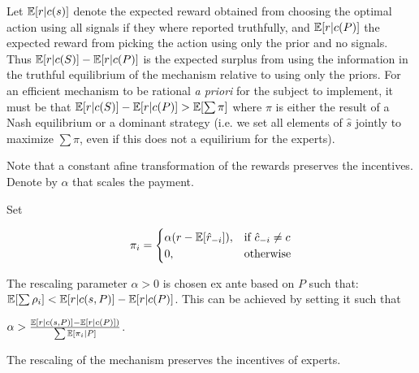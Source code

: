 Let $\operatorname*{\mathbb E}[r|c(s)]$ denote the expected reward obtained from choosing the optimal action using all signals if they where reported truthfully, and $\operatorname*{\mathbb E}[r|c(P)] $ the expected reward from picking the action using only the prior and no signals. Thus $\operatorname*{\mathbb E}[r|c(S)] - \operatorname*{\mathbb E}[r|c(P)] $ is the expected surplus from using the information in the truthful equilibrium of the mechanism relative to using only the priors. For an efficient mechanism to be rational \emph{a priori} for the subject to implement, it must be that $\operatorname*{\mathbb E}[r|c(S)] - \operatorname*{\mathbb E}[r|c(P)] > \operatorname*{\mathbb E}[\sum \pi]$ where $\pi$ is either the result of a Nash equilibrium or a dominant strategy (i.e. we set all elements of $\hat{s}$ jointly to maximize $\sum \pi$, even if this does not a equilirium for the experts).

Note that a constant afine transformation of the rewards preserves the incentives. Denote by $\alpha$ that scales the payment.

\begin{mech}
Set

\[
    \pi_i = 
\begin{cases}
    \alpha (r - \expec[\hat{r}_{-i}] ),& \text{if } \hat{c}_{-i} \neq c\\
    0,              & \text{otherwise}
\end{cases}
\]

The rescaling parameter $\alpha>0$ is chosen ex ante based on $P$ such that: $ \operatorname*{\mathbb E}[\sum \rho_i] < \operatorname*{\mathbb E}[r|c(s,P)] - \operatorname*{\mathbb E}[r|c(P)] $. This can be achieved by setting it such that

 $\alpha >   \frac{\operatorname*{\mathbb E}[r|c(s,P)] - \operatorname*{\mathbb E}[r|c(P)] )}{\sum \operatorname*{\mathbb E}[\pi_i|P] }  $. 

\end{mech}



\begin{lem}
	The rescaling of the mechanism preserves the incentives of experts.
\end{lem}

